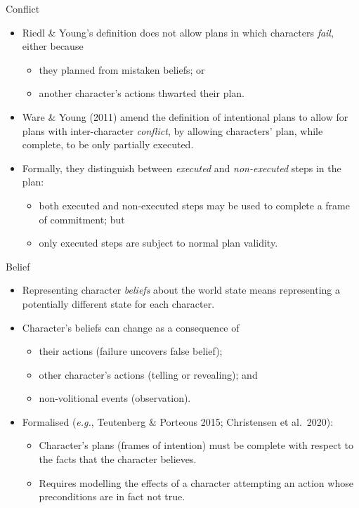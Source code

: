 \documentclass[utf8,13pt]{beamer}
\begin{document}
\begin{frame}{Conflict}
  \begin{itemize}
  \item Riedl \& Young's definition does not allow plans in which
    characters \emph{fail}, either because
    \begin{itemize}
    \item they planned from mistaken beliefs; or
    \item another character's actions thwarted their plan.
    \end{itemize}
  \item Ware \& Young (2011) amend the definition of intentional
    plans to allow for plans with inter-character \emph{conflict},
    by allowing characters' plan, while complete, to be only partially
    executed.
  \item Formally, they distinguish between \emph{executed} and
    \emph{non-executed} steps in the plan:
    \begin{itemize}
    \item both executed and non-executed steps may be used to complete
      a frame of commitment; but
    \item only executed steps are subject to normal plan validity.
    \end{itemize}
  \end{itemize}
\end{frame}

\begin{frame}{Belief}
  \begin{itemize}
  \item Representing character \emph{beliefs} about the world state
    means representing a potentially different state for each character.
  \item Character's beliefs can change as a consequence of
    \begin{itemize}
    \item their actions (failure uncovers false belief);
    \item other character's actions (telling or revealing); and
    \item non-volitional events (observation).
    \end{itemize}
  \item Formalised (\textit{e.g.}, Teutenberg \& Porteous 2015; Christensen
    et al.\ 2020):
    \begin{itemize}
    \item Character's plans (frames of intention) must be complete with
      respect to the facts that the character believes.
    \item Requires modelling the effects of a character attempting an
      action whose preconditions are in fact not true.
    \end{itemize}
  \end{itemize}
\end{frame}
\end{document}
